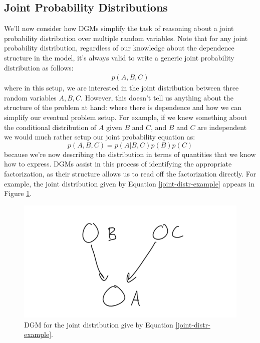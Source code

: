 \subsection{Joint Probability Distributions}
We'll now consider how DGMs simplify the task of reasoning about a joint probability distribution over multiple random variables. Note that for any joint probability distribution, regardless of our knowledge about the dependence structure in the model, it's always valid to write a generic joint probability distribution as follows:
\begin{align*}
	p(A, B, C)
\end{align*}
where in this setup, we are interested in the joint distribution between three random variables $A, B, C$. However, this doesn't tell us anything about the structure of the problem at hand: where there is dependence and how we can simplify our eventual problem setup. For example, if we knew something about the conditional distribution of $A$ given $B$ and $C$, and $B$ and $C$ are independent we would much rather setup our joint probability equation as:
\begin{equation} \label{joint-distr-example}
	p(A, B, C) = p(A | B, C)p(B)p(C)
\end{equation}
because we're now describing the distribution in terms of quantities that we know how to express. DGMs assist in this process of identifying the appropriate factorization, as their structure allows us to read off the factorization directly. For example, the joint distribution given by Equation \ref{joint-distr-example} appears in Figure \ref{fig:joint-distr-example-dgm}.
\begin{figure}
    \centering
    \includegraphics[width=0.5\paperwidth]{../GraphicalModels/fig/joint-distr-example-dgm.png}
    \caption{DGM for the joint distribution give by Equation \ref{joint-distr-example}.}
    \label{fig:joint-distr-example-dgm}
\end{figure}

